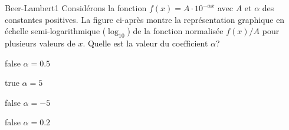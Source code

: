 \documentclass[11pt]{article}
\begin{document}
		\begin{question}{27}{Beer-Lambert}{1}{}
            Considérons la fonction $f(x) = A\cdot 10^{-\alpha x}$ avec $A$ et $\alpha$ des constantes positives. La figure ci-après montre la représentation graphique en échelle semi-logarithmique ($\log_{10}$) de la fonction normalisée $f(x)/A$ pour plusieurs valeurs de $x$. Quelle est la valeur du coefficient $\alpha$?
            \begin{figure}
             \end{figure}
        \end{question}
        \begin{reponses}
            \item[false] $\alpha = \num{0.5}$
		    \item[true] $\alpha = 5$
		    \item[false] $\alpha = -5$
		    \item[false] $\alpha = \num{0.2}$
		    \end{reponses}
        
\end{document}
